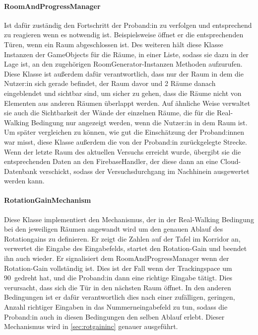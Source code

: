 \begin{multicols*}{2}
    \paragraph{RoomAndProgressManager}
    Ist dafür zuständig den Fortschritt der Proband:in zu verfolgen und entsprechend zu reagieren wenn es notwendig ist. Beispielsweise öffnet er die entsprechenden Türen, wenn ein Raum abgeschlossen ist.
    Des weiteren hält diese Klasse Instanzen der GameObjects für die Räume, in einer Liste, sodass sie dazu in der Lage ist, an den zugehörigen RoomGenerator-Instanzen Methoden aufzurufen. Diese Klasse ist außerdem dafür verantwortlich, dass nur der Raum in dem die Nutzer:in sich gerade befindet, der Raum davor und 2 Räume danach eingeblendet und sichtbar sind, um sicher zu gehen, dass die Räume nicht von Elementen aus anderen Räumen überlappt werden. Auf ähnliche Weise verwaltet sie auch die Sichtbarkeit der Wände der einzelnen Räume, die für die Real-Walking Bedingung nur angezeigt werden, wenn die Nutzer:in in dem Raum ist.
    Um später vergleichen zu können, wie gut die Einschätzung der Proband:innen war misst, diese Klasse außerdem die von der Proband:in zurückgelegte Strecke. Wenn der letzte Raum des aktuellen Versuchs erreicht wurde, übergibt sie die entsprechenden Daten an den FirebaseHandler, der diese dann an eine Cloud-Datenbank verschickt, sodass der Versuchsdurchgang im Nachhinein ausgewertet werden kann.

    \paragraph{RotationGainMechanism}

    Diese Klasse implementiert den Mechanismus, der in der Real-Walking Bedingung bei den jeweiligen Räumen angewandt wird um den genauen Ablauf des Rotationgains zu definieren. Er zeigt die Zahlen auf der Tafel im Korridor an, verwertet die Eingabe des Eingabefelds, startet den Rotation-Gain und beendet ihn auch wieder. Er signalisiert dem RoomAndProgressManager wenn der Rotation-Gain vollständig ist. Dies ist der Fall wenn der Trackingspace um
    90\textdegree\
    gedreht hat, und die Proband:in dann eine richtige Eingabe tätigt. Dies verursacht, dass sich die Tür in den nächsten Raum öffnet. In den anderen Bedingungen ist er dafür verantwortlich dies nach einer zufälligen, geringen, Anzahl richtiger Eingaben in das Nummerneingabefeld zu tun, sodass die Proband:in auch in diesen Bedingungen den selben Ablauf erlebt. Dieser Mechanismus wird in \autoref{sec:rotgaininc} genauer ausgeführt.


\end{multicols*}
